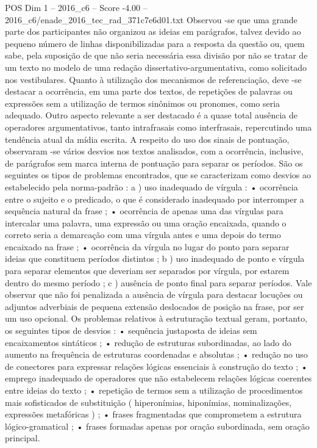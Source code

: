 \begin{textsample}{POS Dim 1 – 2016\_c6 – Score -4.00 – 2016\_c6/enade\_2016\_tec\_rad\_371c7e6d01.txt}
Observou -se que uma grande parte dos participantes não organizou as ideias em parágrafos, talvez devido ao pequeno número de linhas disponibilizadas para a resposta da questão ou, quem sabe, pela suposição de que não seria necessária essa divisão por não se tratar de um texto no modelo de uma redação dissertativo-argumentativa, como solicitado nos vestibulares.
Quanto à utilização dos mecanismos de referenciação, deve -se destacar a ocorrência, em uma parte dos textos, de repetições de palavras ou expressões sem a utilização de termos sinônimos ou pronomes, como seria adequado.
Outro aspecto relevante a ser destacado é a quase total ausência de operadores argumentativos, tanto intrafrasais como interfrasais, repercutindo uma tendência atual da mídia escrita.
A respeito do uso dos sinais de pontuação, observaram -se vários desvios nos textos analisados, com a ocorrência, inclusive, de parágrafos sem marca interna de pontuação para separar os períodos.
São os seguintes os tipos de problemas encontrados, que se caracterizam como desvios ao estabelecido pela norma-padrão : a ) uso inadequado de vírgula : • ocorrência entre o sujeito e o predicado, o que é considerado inadequado por interromper a sequência natural da frase ; • ocorrência de apenas uma das vírgulas para intercalar uma palavra, uma expressão ou uma oração encaixada, quando o correto seria a demarcação com uma vírgula antes e uma depois do termo encaixado na frase ; • ocorrência da vírgula no lugar do ponto para separar ideias que constituem períodos distintos ; b ) uso inadequado de ponto e vírgula para separar elementos que deveriam ser separados por vírgula, por estarem dentro do mesmo período ; c ) ausência de ponto final para separar períodos.
Vale observar que não foi penalizada a ausência de vírgula para destacar locuções ou adjuntos adverbiais de pequena extensão deslocados de posição na frase, por ser um uso opcional.
Os problemas relativos à estruturação textual geram, portanto, os seguintes tipos de desvios : • sequência justaposta de ideias sem encaixamentos sintáticos ; • redução de estruturas subordinadas, ao lado do aumento na frequência de estruturas coordenadas e absolutas ; • redução no uso de conectores para expressar relações lógicas essenciais à construção do texto ; • emprego inadequado de operadores que não estabelecem relações lógicas coerentes entre ideias do texto ; • repetição de termos sem a utilização de procedimentos mais sofisticados de substituição ( hiperonímias, hiponímias, nominalizações, expressões metafóricas ) ; • frases fragmentadas que comprometem a estrutura lógico-gramatical ; • frases formadas apenas por oração subordinada, sem oração principal.

\end{textsample}
